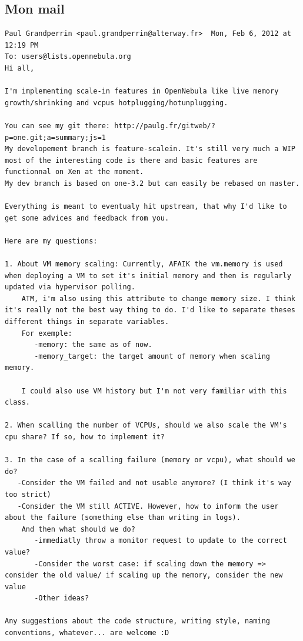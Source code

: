 \subsection{Mon mail}
\begin{lstlisting}
Paul Grandperrin <paul.grandperrin@alterway.fr>	 Mon, Feb 6, 2012 at 12:19 PM
To: users@lists.opennebula.org
Hi all,

I'm implementing scale-in features in OpenNebula like live memory growth/shrinking and vcpus hotplugging/hotunplugging.

You can see my git there: http://paulg.fr/gitweb/?p=one.git;a=summary;js=1
My developement branch is feature-scalein. It's still very much a WIP most of the interesting code is there and basic features are functionnal on Xen at the moment.
My dev branch is based on one-3.2 but can easily be rebased on master.

Everything is meant to eventualy hit upstream, that why I'd like to get some advices and feedback from you.

Here are my questions:

1. About VM memory scaling: Currently, AFAIK the vm.memory is used when deploying a VM to set it's initial memory and then is regularly updated via hypervisor polling.
    ATM, i'm also using this attribute to change memory size. I think it's really not the best way thing to do. I'd like to separate theses different things in separate variables.
    For exemple:
       -memory: the same as of now.
       -memory_target: the target amount of memory when scaling memory.

    I could also use VM history but I'm not very familiar with this class.

2. When scalling the number of VCPUs, should we also scale the VM's cpu share? If so, how to implement it?

3. In the case of a scalling failure (memory or vcpu), what should we do?
   -Consider the VM failed and not usable anymore? (I think it's way too strict)
   -Consider the VM still ACTIVE. However, how to inform the user about the failure (something else than writing in logs).
    And then what should we do?
       -immediatly throw a monitor request to update to the correct value?
       -Consider the worst case: if scaling down the memory => consider the old value/ if scaling up the memory, consider the new value
       -Other ideas?

Any suggestions about the code structure, writing style, naming conventions, whatever... are welcome :D


\end{lstlisting}
